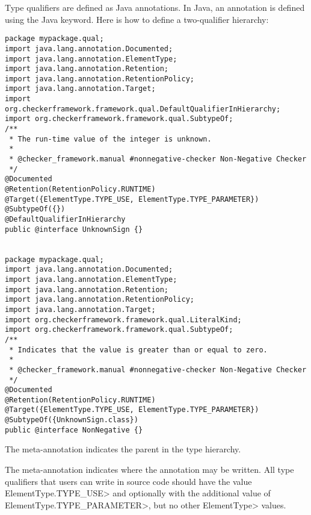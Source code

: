 Type qualifiers are defined as Java annotations.  In Java, an
annotation is defined using the Java  keyword.
Here is how to define a two-qualifier hierarchy:

\begin{Verbatim}
package mypackage.qual;
import java.lang.annotation.Documented;
import java.lang.annotation.ElementType;
import java.lang.annotation.Retention;
import java.lang.annotation.RetentionPolicy;
import java.lang.annotation.Target;
import org.checkerframework.framework.qual.DefaultQualifierInHierarchy;
import org.checkerframework.framework.qual.SubtypeOf;
/**
 * The run-time value of the integer is unknown.
 *
 * @checker_framework.manual #nonnegative-checker Non-Negative Checker
 */
@Documented
@Retention(RetentionPolicy.RUNTIME)
@Target({ElementType.TYPE_USE, ElementType.TYPE_PARAMETER})
@SubtypeOf({})
@DefaultQualifierInHierarchy
public @interface UnknownSign {}


package mypackage.qual;
import java.lang.annotation.Documented;
import java.lang.annotation.ElementType;
import java.lang.annotation.Retention;
import java.lang.annotation.RetentionPolicy;
import java.lang.annotation.Target;
import org.checkerframework.framework.qual.LiteralKind;
import org.checkerframework.framework.qual.SubtypeOf;
/**
 * Indicates that the value is greater than or equal to zero.
 *
 * @checker_framework.manual #nonnegative-checker Non-Negative Checker
 */
@Documented
@Retention(RetentionPolicy.RUNTIME)
@Target({ElementType.TYPE_USE, ElementType.TYPE_PARAMETER})
@SubtypeOf({UnknownSign.class})
public @interface NonNegative {}
\end{Verbatim}

The  meta-annotation
indicates the parent in the type hierarchy.

The 
meta-annotation indicates where the annotation
may be written. All type qualifiers that users can write in source code should
have the value \<ElementType.TYPE\_USE> and optionally with the additional value
of \<ElementType.TYPE\_PARAMETER>, but no other \<ElementType> values.

